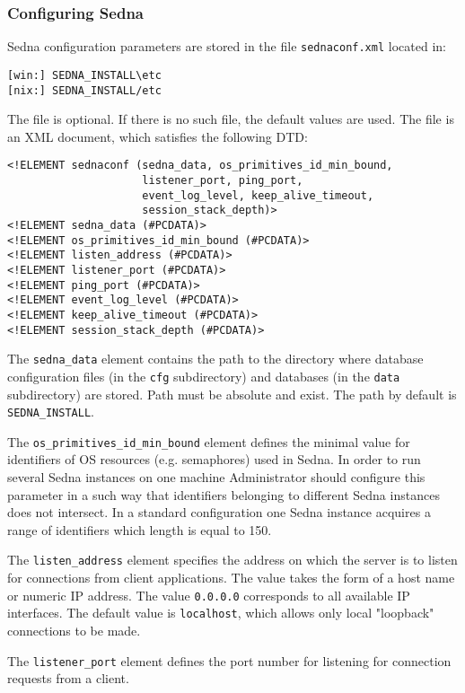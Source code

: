 \documentclass[a4paper,12pt]{article}
\begin{document}
\subsubsection{Configuring Sedna}
\label{sec:ConfigSedna}
Sedna configuration parameters are stored in the file \verb!sednaconf.xml!
located in:

\begin{verbatim}
[win:] SEDNA_INSTALL\etc
[nix:] SEDNA_INSTALL/etc
\end{verbatim}

The file is optional. If there is no such file, the default values are used.
The file is an XML document, which satisfies the following DTD:

\small{
\begin{verbatim}
<!ELEMENT sednaconf (sedna_data, os_primitives_id_min_bound,
                     listener_port, ping_port,
                     event_log_level, keep_alive_timeout,
                     session_stack_depth)>
<!ELEMENT sedna_data (#PCDATA)>
<!ELEMENT os_primitives_id_min_bound (#PCDATA)>
<!ELEMENT listen_address (#PCDATA)>
<!ELEMENT listener_port (#PCDATA)>
<!ELEMENT ping_port (#PCDATA)>
<!ELEMENT event_log_level (#PCDATA)>
<!ELEMENT keep_alive_timeout (#PCDATA)>
<!ELEMENT session_stack_depth (#PCDATA)>
\end{verbatim}}

The \verb!sedna_data! element contains the path to the directory where database
configuration files (in the \verb!cfg! subdirectory) and databases (in the
\verb!data! subdirectory) are stored. Path must be absolute and exist. The path
by default is \verb!SEDNA_INSTALL!.

The \verb!os_primitives_id_min_bound! element defines the minimal value for
identifiers of OS resources (e.g. semaphores) used in Sedna. In order to run
several Sedna instances on one machine Administrator should configure this
parameter in a such way that identifiers belonging to different Sedna instances
does not intersect. In a standard configuration one Sedna instance acquires a
range of identifiers which length is equal to 150.

The \verb!listen_address! element specifies the address on which the server is
to listen for connections from client applications. The value takes the form of
a host name or numeric IP address. The value \verb!0.0.0.0! corresponds to all
available IP interfaces. The default value is \verb!localhost!, which allows
only local "loopback" connections to be made.

The \verb!listener_port! element defines the port number for listening for
connection requests from a client.
\end{document}
